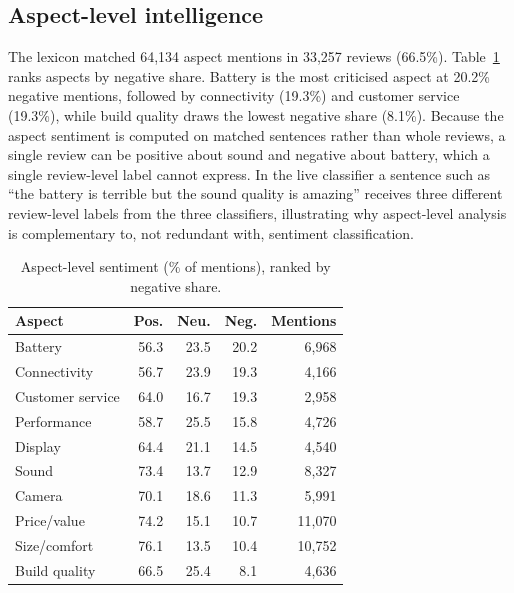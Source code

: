 \documentclass[conference]{IEEEtran}
\begin{document}
\subsection{Aspect-level intelligence}
The lexicon matched 64{,}134 aspect mentions in 33{,}257 reviews (66.5\%). Table~\ref{tab:aspect} ranks aspects by negative share. Battery is the most criticised aspect at 20.2\% negative mentions, followed by connectivity (19.3\%) and customer service (19.3\%), while build quality draws the lowest negative share (8.1\%). Because the aspect sentiment is computed on matched sentences rather than whole reviews, a single review can be positive about sound and negative about battery, which a single review-level label cannot express. In the live classifier a sentence such as ``the battery is terrible but the sound quality is amazing'' receives three different review-level labels from the three classifiers, illustrating why aspect-level analysis is complementary to, not redundant with, sentiment classification.

\begin{table}[t]
\caption{Aspect-level sentiment (\% of mentions), ranked by negative share.}
\label{tab:aspect}
\centering
\footnotesize
\begin{tabular}{@{}lrrrr@{}}
\toprule
Aspect & Pos. & Neu. & Neg. & Mentions \\
\midrule
Battery & 56.3 & 23.5 & 20.2 & 6{,}968 \\
Connectivity & 56.7 & 23.9 & 19.3 & 4{,}166 \\
Customer service & 64.0 & 16.7 & 19.3 & 2{,}958 \\
Performance & 58.7 & 25.5 & 15.8 & 4{,}726 \\
Display & 64.4 & 21.1 & 14.5 & 4{,}540 \\
Sound & 73.4 & 13.7 & 12.9 & 8{,}327 \\
Camera & 70.1 & 18.6 & 11.3 & 5{,}991 \\
Price/value & 74.2 & 15.1 & 10.7 & 11{,}070 \\
Size/comfort & 76.1 & 13.5 & 10.4 & 10{,}752 \\
Build quality & 66.5 & 25.4 & 8.1 & 4{,}636 \\
\bottomrule
\end{tabular}
\end{table}
\end{document}
